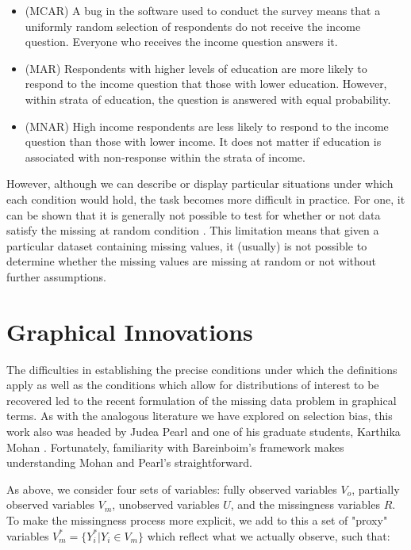 \documentclass[12pt,twoside]{reedthesis}
\theoremstyle{definition}
\begin{document}
\begin{itemize}
\item (MCAR) A bug in the software used to conduct the survey means that a uniformly random selection of respondents do not receive the income question. Everyone who receives the income question answers it. 

\item (MAR) Respondents with higher levels of education are more likely to respond to the income question that those with lower education. However, within strata of education, the question is answered with equal probability.

\item (MNAR) High income respondents are less likely to respond to the income question than those with lower income. It does not matter if education is associated with non-response within the strata of income.  
\end{itemize}

However, although we can describe or display particular situations under which each condition would hold, the task becomes more difficult in practice. For one, it can be shown that it is generally not possible to test for whether or not data satisfy the missing at random condition \citep{Schafer_2002}. This limitation means that given a particular dataset containing missing values, it  (usually) is not possible to determine whether the missing values are missing at random or not without further assumptions.
\section{Graphical Innovations}

The difficulties in establishing the precise conditions under which the definitions apply as well as the conditions which allow for distributions of interest to be recovered led to the recent formulation of the missing data problem in graphical terms. As with the analogous literature we have explored on selection bias, this work also was headed by Judea Pearl and one of his graduate students, Karthika Mohan \citep{Mohan_2013} \citep{Mohan_2019}. Fortunately, familiarity with Bareinboim's framework makes understanding Mohan and Pearl's straightforward. 

As above, we consider four sets of variables: fully observed variables $V_o$, partially observed variables $V_m$, unobserved variables $U$, and the missingness variables $R$. To make the missingness process more explicit, we add to this a set of "proxy" variables $V^*_m = \{Y_i^* | Y_i \in V_m\}$ which reflect what we actually observe, such that:
\end{document}
